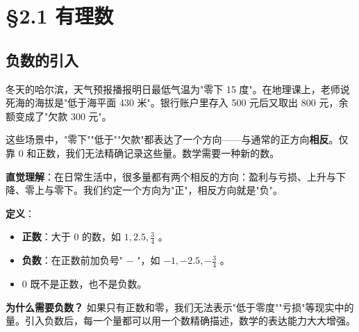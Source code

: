 \chapter{§2.1 有理数}
\label{sec:2.1}





\section*{负数的引入}


\begin{explore}


冬天的哈尔滨，天气预报播报明日最低气温为"零下 15 度"。在地理课上，老师说死海的海拔是"低于海平面 430 米"。银行账户里存入 500 元后又取出 800 元，余额变成了"欠款 300 元"。

这些场景中，"零下""低于""欠款"都表达了一个方向——与通常的正方向\textbf{相反}。仅靠 0 和正数，我们无法精确记录这些量。数学需要一种新的数。

\end{explore}

\begin{understand}


\textbf{直觉理解}：在日常生活中，很多量都有两个相反的方向：盈利与亏损、上升与下降、零上与零下。我们约定一个方向为"正"，相反方向就是"负"。

\textbf{定义}：

\begin{itemize}
  \item \textbf{正数}：大于 0 的数，如 $1, 2.5, \frac{3}{4}$ 。
  \item \textbf{负数}：在正数前加负号" $-$ "，如 $-1, -2.5, -\frac{3}{4}$ 。
  \item $0$ 既不是正数，也不是负数。
\end{itemize}


\textbf{为什么需要负数？} 如果只有正数和零，我们无法表示"低于零度""亏损"等现实中的量。引入负数后，每一个量都可以用一个数精确描述，数学的表达能力大大增强。

\end{understand}


